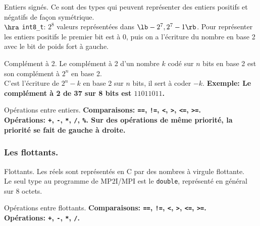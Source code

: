 \documentclass[french, 11pt]{article}
\begin{document}
\begin{defi}{Entiers signés.}{}
    Ce sont des types qui peuvent représenter des entiers positifs et négatifs de façon symétrique.\\
    $\hra$ \texttt{int8\_t}: $2^8$ valeurs représentées dans $\lb-2^7, 2^7-1\rb$.\n
    Pour représenter les entiers positifs le premier bit est à 0, puis on a l'écriture du nombre en base 2 avec le bit de poids fort à gauche.
\end{defi}

\vspace*{-0.5cm}

\begin{defi}{Complément à 2.}{}
    Le complément à 2 d'un nombre $k$ codé sur $n$ bits en base 2 est son complément à $2^n$ en base 2.\\
    C'est l'écriture de $2^n-k$ en base 2 sur $n$ bits, il sert à coder $-k$.\n
    \bf{Exemple:} Le complément à 2 de 37 sur 8 bits est $11011011$.
\end{defi}

\vspace*{-0.5cm}

\begin{defi}{Opérations entre entiers.}{}
    \bf{Comparaisons:} \texttt{==}, \texttt{!=}, \texttt{<}, \texttt{>}, \texttt{<=}, \texttt{>=}.\\
    \bf{Opérations:} \texttt{+}, \texttt{-}, \texttt{*}, \texttt{/}, \texttt{\%}.\n
    Sur des opérations de même priorité, la priorité se fait de gauche à droite.
\end{defi}

\subsubsection{Les flottants.}

\begin{defi}{Flottants.}{}
    Les réels sont représentés en C par des nombres à virgule flottante.\\
    Le seul type au programme de MP2I/MPI est le \texttt{double}, représenté en général sur 8 octets.
\end{defi}

\vspace*{-0.5cm}

\begin{defi}{Opérations entre flottants.}{}
    \bf{Comparaisons:} \texttt{==}, \texttt{!=}, \texttt{<}, \texttt{>}, \texttt{<=}, \texttt{>=}.\\
    \bf{Opérations:} \texttt{+}, \texttt{-}, \texttt{*}, \texttt{/}.
\end{defi}
\end{document}
